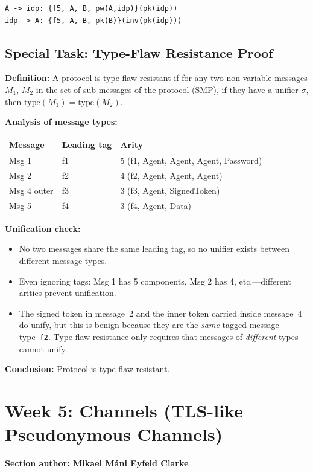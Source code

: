 \documentclass[11pt,a4paper]{article}
\newcommand{\sectionauthor}[1]{\noindent\textbf{Section author: #1}\par\medskip}
\begin{document}
\begin{lstlisting}[style=anb,caption={Key lookup protocol}]
A -> idp: {f5, A, B, pw(A,idp)}(pk(idp))
idp -> A: {f5, A, B, pk(B)}(inv(pk(idp)))
\end{lstlisting}

\subsection{Special Task: Type-Flaw Resistance Proof}
\textbf{Definition:} A protocol is type-flaw resistant if for any two non-variable messages $M_1$, $M_2$ in the set of sub-messages of the protocol (SMP), if they have a unifier $\sigma$, then
$\text{type}(M_1) = \text{type}(M_2)$.

\textbf{Analysis of message types:}
\begin{center}
\begin{tabular}{lll}
\toprule
Message & Leading tag & Arity \\
\midrule
Msg 1 & f1 & 5 (f1, Agent, Agent, Agent, Password) \\
Msg 2 & f2 & 4 (f2, Agent, Agent, Agent) \\
Msg 4 outer & f3 & 3 (f3, Agent, SignedToken) \\
Msg 5 & f4 & 3 (f4, Agent, Data) \\
\bottomrule
\end{tabular}
\end{center}

\textbf{Unification check:}
\begin{itemize}[leftmargin=*]
  \item No two messages share the same leading tag, so no unifier exists between different message types.
  \item Even ignoring tags: Msg 1 has 5 components, Msg 2 has 4, etc.---different arities prevent unification.
  \item The signed token in message~2 and the inner token carried inside message~4 do unify,
        but this is benign because they are the \emph{same} tagged message type~\texttt{f2}.
        Type-flaw resistance only requires that messages of \emph{different} types cannot unify.
\end{itemize}

\textbf{Conclusion:} Protocol is type-flaw resistant.

\section{Week 5: Channels (TLS-like Pseudonymous Channels)}
\sectionauthor{Mikael Máni Eyfeld Clarke}
\end{document}

